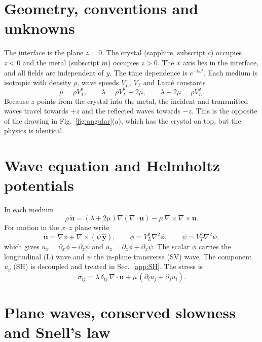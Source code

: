 \documentclass[11pt,a4paper]{article}
\newcommand{\ii}{\mathrm{i}}
\newcommand{\uu}{\mathbf{u}}
\begin{document}
\section{Geometry, conventions and unknowns}

The interface is the plane $z=0$. The crystal (sapphire, subscript $c$) occupies $z<0$ and
the metal (subscript $m$) occupies $z>0$. The $x$ axis lies in the interface, and all fields
are independent of $y$. The time dependence is $e^{-\ii\omega t}$. Each medium is isotropic
with density $\rho$, wave speeds $V_L$, $V_T$ and Lam\'e constants
\begin{equation}
  \mu=\rho V_T^2,\qquad \lambda=\rho V_L^2-2\mu,\qquad \lambda+2\mu=\rho V_L^2 .
\end{equation}
Because $z$ points from the crystal into the metal, the incident and transmitted waves travel
towards $+z$ and the reflected waves towards $-z$. This is the opposite of the drawing in
Fig.~\ref{fig:angular}(a), which has the crystal on top, but the physics is
identical.

\section{Wave equation and Helmholtz potentials}

In each medium
\begin{equation}
  \rho\,\ddot{\uu}=(\lambda+2\mu)\nabla(\nabla\!\cdot\!\uu)-\mu\,\nabla\times\nabla\times\uu .
\end{equation}
For motion in the $x$--$z$ plane write
\begin{equation}
  \uu=\nabla\phi+\nabla\times(\psi\,\hat{\mathbf y}),\qquad
  \ddot\phi=V_L^2\nabla^2\phi,\qquad \ddot\psi=V_T^2\nabla^2\psi ,
\end{equation}
which gives $u_x=\partial_x\phi-\partial_z\psi$ and $u_z=\partial_z\phi+\partial_x\psi$.
The scalar $\phi$ carries the longitudinal (L) wave and $\psi$ the in-plane transverse (SV)
wave. The component $u_y$ (SH) is decoupled and treated in Sec.~\ref{app:SH}. The stress is
\begin{equation}
  \sigma_{ij}=\lambda\,\delta_{ij}\,\nabla\!\cdot\!\uu+\mu\,(\partial_iu_j+\partial_ju_i).
\end{equation}

\section{Plane waves, conserved slowness and Snell's law}
\end{document}

